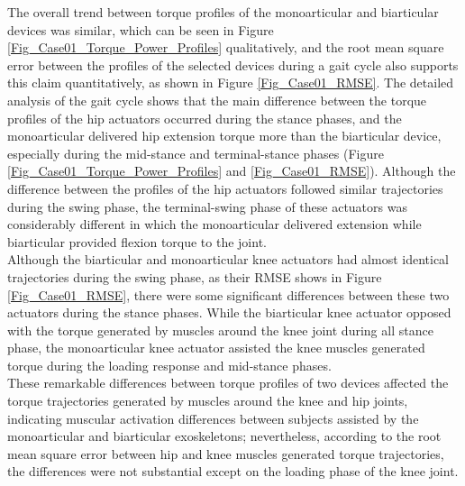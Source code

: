 \documentclass[10pt,letterpaper]{article}
\begin{document}
The overall trend between torque profiles of the monoarticular and biarticular devices was similar, which can be seen in Figure \ref{Fig_Case01_Torque_Power_Profiles} qualitatively, and the root mean square error between the profiles of the selected devices during a gait cycle also supports this claim quantitatively, as shown in Figure \ref{Fig_Case01_RMSE}. The detailed analysis of the gait cycle shows that the main difference between the torque profiles of the hip actuators occurred during the stance phases, and the monoarticular delivered hip extension torque more than the biarticular device, especially during the mid-stance and terminal-stance phases (Figure \ref{Fig_Case01_Torque_Power_Profiles} and \ref{Fig_Case01_RMSE}). Although the difference between the profiles of the hip actuators followed similar trajectories during the swing phase, the terminal-swing phase of these actuators was considerably different in which the monoarticular delivered extension while biarticular provided flexion torque to the joint.\\
Although the biarticular and monoarticular knee actuators had almost identical trajectories during the swing phase, as their RMSE shows in Figure \ref{Fig_Case01_RMSE}, there were some significant differences between these two actuators during the stance phases. While the biarticular knee actuator opposed with the torque generated by muscles around the knee joint during all stance phase, the monoarticular knee actuator assisted the knee muscles generated torque during the loading response and mid-stance phases.\\
These remarkable differences between torque profiles of two devices affected the torque trajectories generated by muscles around the knee and hip joints, indicating muscular activation differences between subjects assisted by the monoarticular and biarticular exoskeletons; nevertheless, according to the root mean square error between hip and knee muscles generated torque trajectories, the differences were not substantial except on the loading phase of the knee joint.\\
\end{document}

